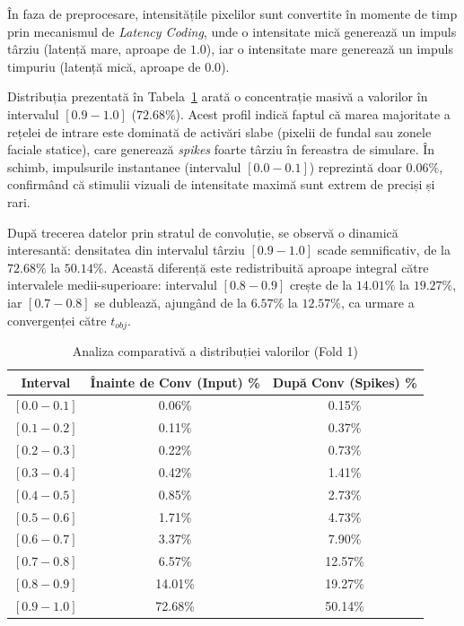 În faza de preprocesare, intensitățile pixelilor sunt convertite în momente de timp prin mecanismul de \textit{Latency Coding}, unde o intensitate mică generează un impuls târziu (latență mare, aproape de $1.0$), iar o intensitate mare generează un impuls timpuriu (latență mică, aproape de $0.0$). 

Distribuția prezentată în Tabela~\ref{tab:dist_input} arată o concentrație masivă a valorilor în intervalul $[0.9 - 1.0]$ ($72.68\%$). Acest profil indică faptul că marea majoritate a rețelei de intrare este dominată de activări slabe (pixelii de fundal sau zonele faciale statice), care generează \textit{spikes} foarte târziu în fereastra de simulare. În schimb, impulsurile instantanee (intervalul $[0.0 - 0.1]$) reprezintă doar $0.06\%$, confirmând că stimulii vizuali de intensitate maximă sunt extrem de preciși și rari.

După trecerea datelor prin stratul de convoluție, se observă o dinamică interesantă: densitatea din intervalul târziu $[0.9 - 1.0]$ scade semnificativ, de la $72.68\%$ la $50.14\%$. Această diferență este redistribuită aproape integral către intervalele medii-superioare: intervalul $[0.8 - 0.9]$ crește de la $14.01\%$ la $19.27\%$, iar $[0.7 - 0.8]$ se dublează, ajungând de la $6.57\%$ la $12.57\%$, ca urmare a convergenței către $t_{obj}$.

\begin{table}[h!]
	\centering
	\caption{Analiza comparativă a distribuției valorilor (Fold 1)}
	\label{tab:dist_input}
	\begin{tabular}{@{}ccc@{}}
		\toprule
		\textbf{Interval} & \textbf{Înainte de Conv (Input) \%} & \textbf{După Conv (Spikes) \%} \\ \midrule
		$[0.0 - 0.1]$ & 0.06\% & 0.15\% \\
		$[0.1 - 0.2]$ & 0.11\% & 0.37\% \\
		$[0.2 - 0.3]$ & 0.22\% & 0.73\% \\
		$[0.3 - 0.4]$ & 0.42\% & 1.41\% \\
		$[0.4 - 0.5]$ & 0.85\% & 2.73\% \\
		$[0.5 - 0.6]$ & 1.71\% & 4.73\% \\
		$[0.6 - 0.7]$ & 3.37\% & 7.90\% \\
		$[0.7 - 0.8]$ & 6.57\% & 12.57\% \\
		$[0.8 - 0.9]$ & 14.01\% & 19.27\% \\
		$[0.9 - 1.0]$ & 72.68\% & 50.14\% \\ \bottomrule
	\end{tabular}
\end{table}

